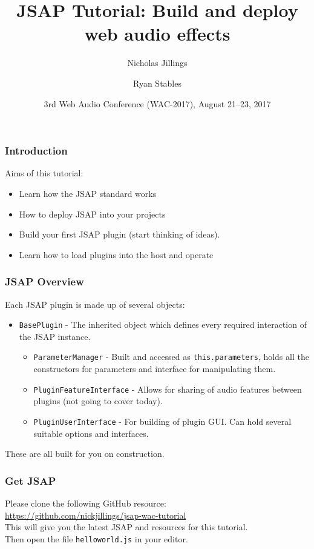 \documentclass{beamer}
\title[JSAP Tutorial]{JSAP Tutorial: Build and deploy web audio effects}
\author[Jillings and Stables]%
{Nicholas Jillings \and Ryan Stables}
\institute[BCU]
{
  Digital Media Technology Lab\\
  Birmingham City University\\
  Curzon Street, Birmingham, UK
}
\date[WAC 2017] %
{3rd Web Audio Conference (WAC-2017), August 21--23, 2017}
\begin{document}
 
\frame{\titlepage}

\begin{frame}
\frametitle{Introduction}

Aims of this tutorial:
\begin{itemize}
\item Learn how the JSAP standard works
\item How to deploy JSAP into your projects
\item Build your first JSAP plugin (start thinking of ideas).
\item Learn how to load plugins into the host and operate
\end{itemize}

\end{frame}

\begin{frame}
\frametitle{JSAP Overview}
Each JSAP plugin is made up of several objects:
\begin{itemize}
\item \texttt{BasePlugin} - The inherited object which defines every required interaction of the JSAP instance.
\begin{itemize}
\item \texttt{ParameterManager} - Built and accessed as \texttt{this.parameters}, holds all the constructors for parameters and interface for manipulating them.
\item \texttt{PluginFeatureInterface} - Allows for sharing of audio features between plugins (not going to cover today).
\item \texttt{PluginUserInterface} - For building of plugin GUI. Can hold several suitable options and interfaces.
\end{itemize}
\end{itemize}
These are all built for you on construction.
\end{frame}

\begin{frame}
\frametitle{Get JSAP}
Please clone the following GitHub resource:\\
\url{https://github.com/nickjillings/jsap-wac-tutorial}\\
This will give you the latest JSAP and resources for this tutorial.\\
Then open the file \texttt{helloworld.js} in your editor.\\
\end{frame}
\end{document}
